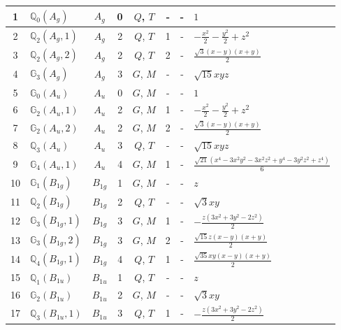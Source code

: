 \documentclass[fleqn,10pt,landscape]{jsarticle}
\begin{document}
\begin{longtable}[l]{clcccccl}
1 & $\mathbb{Q}_{0}(A_{g})$ & $A_{g}$ & 0 & $Q$, $T$ & - & - & $1$ \\ \hline
2 & $\mathbb{Q}_{2}(A_{g},1)$ & $A_{g}$ & 2 & $Q$, $T$ & 1 & - & $- \frac{x^{2}}{2} - \frac{y^{2}}{2} + z^{2}$ \\ \hline
3 & $\mathbb{Q}_{2}(A_{g},2)$ & $A_{g}$ & 2 & $Q$, $T$ & 2 & - & $\frac{\sqrt{3} \left(x - y\right) \left(x + y\right)}{2}$ \\ \hline
4 & $\mathbb{G}_{3}(A_{g})$ & $A_{g}$ & 3 & $G$, $M$ & - & - & $\sqrt{15} x y z$ \\ \hline
5 & $\mathbb{G}_{0}(A_{u})$ & $A_{u}$ & 0 & $G$, $M$ & - & - & $1$ \\ \hline
6 & $\mathbb{G}_{2}(A_{u},1)$ & $A_{u}$ & 2 & $G$, $M$ & 1 & - & $- \frac{x^{2}}{2} - \frac{y^{2}}{2} + z^{2}$ \\ \hline
7 & $\mathbb{G}_{2}(A_{u},2)$ & $A_{u}$ & 2 & $G$, $M$ & 2 & - & $\frac{\sqrt{3} \left(x - y\right) \left(x + y\right)}{2}$ \\ \hline
8 & $\mathbb{Q}_{3}(A_{u})$ & $A_{u}$ & 3 & $Q$, $T$ & - & - & $\sqrt{15} x y z$ \\ \hline
9 & $\mathbb{G}_{4}(A_{u},1)$ & $A_{u}$ & 4 & $G$, $M$ & 1 & - & $\frac{\sqrt{21} \left(x^{4} - 3 x^{2} y^{2} - 3 x^{2} z^{2} + y^{4} - 3 y^{2} z^{2} + z^{4}\right)}{6}$ \\ \hline
10 & $\mathbb{G}_{1}(B_{1g})$ & $B_{1g}$ & 1 & $G$, $M$ & - & - & $z$ \\ \hline
11 & $\mathbb{Q}_{2}(B_{1g})$ & $B_{1g}$ & 2 & $Q$, $T$ & - & - & $\sqrt{3} x y$ \\ \hline
12 & $\mathbb{G}_{3}(B_{1g},1)$ & $B_{1g}$ & 3 & $G$, $M$ & 1 & - & $- \frac{z \left(3 x^{2} + 3 y^{2} - 2 z^{2}\right)}{2}$ \\ \hline
13 & $\mathbb{G}_{3}(B_{1g},2)$ & $B_{1g}$ & 3 & $G$, $M$ & 2 & - & $\frac{\sqrt{15} z \left(x - y\right) \left(x + y\right)}{2}$ \\ \hline
14 & $\mathbb{Q}_{4}(B_{1g},1)$ & $B_{1g}$ & 4 & $Q$, $T$ & 1 & - & $\frac{\sqrt{35} x y \left(x - y\right) \left(x + y\right)}{2}$ \\ \hline
15 & $\mathbb{Q}_{1}(B_{1u})$ & $B_{1u}$ & 1 & $Q$, $T$ & - & - & $z$ \\ \hline
16 & $\mathbb{G}_{2}(B_{1u})$ & $B_{1u}$ & 2 & $G$, $M$ & - & - & $\sqrt{3} x y$ \\ \hline
17 & $\mathbb{Q}_{3}(B_{1u},1)$ & $B_{1u}$ & 3 & $Q$, $T$ & 1 & - & $- \frac{z \left(3 x^{2} + 3 y^{2} - 2 z^{2}\right)}{2}$ \\ \hline

\end{longtable}
\end{document}
